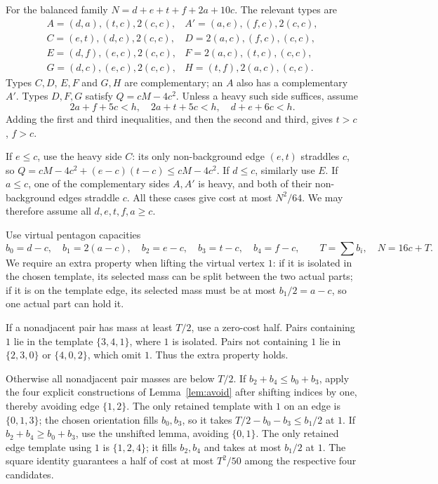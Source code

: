 \documentclass[11pt]{article}
\begin{document}
For the balanced family $N=d+e+t+f+2a+10c$.
The relevant types are
\[
\begin{array}{ll}
 A=(d,a),(t,c),2(c,c),&A'=(a,e),(f,c),2(c,c),\\
 C=(e,t),(d,c),2(c,c),&D=2(a,c),(f,c),(c,c),\\
 E=(d,f),(e,c),2(c,c),&F=2(a,c),(t,c),(c,c),\\
 G=(d,c),(e,c),2(c,c),&H=(t,f),2(a,c),(c,c).
\end{array}
\]
Types $C,D$, $E,F$ and $G,H$ are complementary;
an $A$ also has a complementary $A'$.
Types $D,F,G$ satisfy $Q=cM-4c^2$.
Unless a heavy such side suffices, assume
\[
 2a+f+5c<h,\quad 2a+t+5c<h,\quad d+e+6c<h. \tag{TB}
\]
Adding the first and third inequalities, and then the second and third,
gives $t>c$, $f>c$.

If $e\leq c$, use the heavy side $C$:
its only non-background edge $(e,t)$ straddles $c$, so
$Q=cM-4c^2+(e-c)(t-c)\leq cM-4c^2$.
If $d\leq c$, similarly use $E$.
If $a\leq c$, one of the complementary sides $A,A'$ is heavy,
and both of their non-background edges straddle $c$.
All these cases give cost at most $N^2/64$.
We may therefore assume all $d,e,t,f,a\geq c$.

Use virtual pentagon capacities
\[
 b_0=d-c,\quad b_1=2(a-c),\quad b_2=e-c,\quad
 b_3=t-c,\quad b_4=f-c,
 \qquad T=\sum b_i,\quad N=16c+T .
\]
We require an extra property when lifting the virtual vertex $1$:
if it is isolated in the chosen template, its selected mass can be
split between the two actual parts;
if it is on the template edge, its selected mass must be at most
$b_1/2=a-c$, so one actual part can hold it.

If a nonadjacent pair has mass at least $T/2$, use a zero-cost half.
Pairs containing $1$ lie in the template $\{3,4,1\}$, where $1$ is isolated.
Pairs not containing $1$ lie in $\{2,3,0\}$ or $\{4,0,2\}$,
which omit $1$. Thus the extra property holds.

Otherwise all nonadjacent pair masses are below $T/2$.
If $b_2+b_4\leq b_0+b_3$, apply the four explicit constructions of
Lemma~\ref{lem:avoid} after shifting indices by one, thereby avoiding
edge $\{1,2\}$.
The only retained template with $1$ on an edge is $\{0,1,3\}$;
the chosen orientation fills $b_0,b_3$, so it takes
$T/2-b_0-b_3\leq b_1/2$ at $1$.
If $b_2+b_4\geq b_0+b_3$, use the unshifted lemma, avoiding $\{0,1\}$.
The only retained edge template using $1$ is $\{1,2,4\}$;
it fills $b_2,b_4$ and takes at most $b_1/2$ at $1$.
The square identity guarantees a half of cost at most $T^2/50$
among the respective four candidates.
\end{document}
